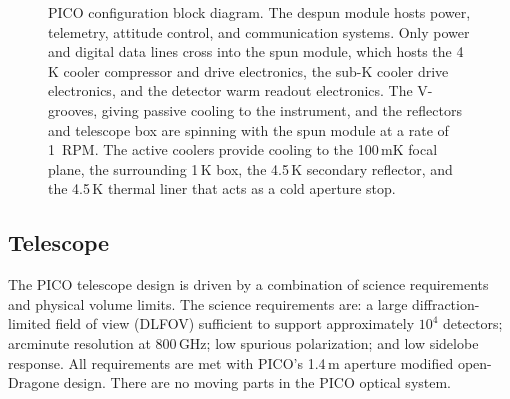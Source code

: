 \begin{figure}[h]
\hspace{-0.in}
\parbox{4.1in}{ }
\hspace{0.12in}
\parbox{2.2in}{
\caption{\captiontext
PICO configuration block diagram. The despun module hosts power, telemetry, attitude control, and communication systems. Only power and digital data lines cross into the spun module, which hosts the 4\,K cooler compressor and drive electronics, the sub-K cooler drive electronics, and the detector warm readout electronics. The V-grooves, giving passive cooling to the instrument, and the reflectors and telescope box are spinning with the spun module at a rate of 1~RPM. The active coolers provide cooling to the 100\,mK focal plane, the surrounding 1\,K box, the 4.5\,K secondary reflector, and the 4.5\,K thermal liner that acts as a cold aperture stop. 
\label{fig:ArchitectureBlockDiagram} } } 
\vspace{-0.in}
\end{figure}


\subsection{Telescope}
\label{sec:telescope} %

The PICO telescope design is driven by a combination of science requirements and physical volume limits. The science requirements are: a large diffraction-limited field of view (DLFOV) sufficient to support approximately $10^4$ detectors; arcminute resolution at 800\,GHz; low spurious polarization; and low sidelobe response. All requirements are met with PICO's 1.4\,m aperture modified open-Dragone design. There are no moving parts in the PICO optical system.


